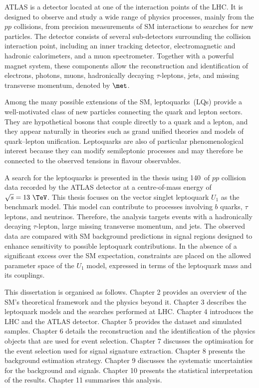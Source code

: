 ATLAS is a detector located at one of the interaction points of the LHC. 
It is designed to observe and study a wide range of physics processes, mainly from the $pp$ collisions, from precision measurements of SM interactions to searches for new particles. 
The detector consists of several sub-detectors surrounding the collision interaction point, including an inner tracking detector, electromagnetic and hadronic calorimeters, and a muon spectrometer. 
Together with a powerful magnet system, these components allow the reconstruction and identification of electrons, photons, muons, hadronically decaying $\tau$-leptons, jets, and missing transverse momentum, denoted by $\met$.

Among the many possible extensions of the SM, leptoquarks~(LQs) provide a well-motivated class of new particles connecting the quark and lepton sectors. 
They are hypothetical bosons that couple directly to a quark and a lepton, and they appear naturally in theories such as grand unified theories and models of quark--lepton unification. 
Leptoquarks are also of particular phenomenological interest because they can modify semileptonic processes and may therefore be connected to the observed tensions in flavour observables.

A search for the leptoquarks is presented in the thesis using 140~\ifb of $pp$ collision data recorded by the ATLAS detector at a centre-of-mass energy of $\sqrt{s}=13~\TeV$. 
This thesis focuses on the vector singlet leptoquark $U_{1}$ as the benchmark model. 
This model can contribute to processes involving $b$ quarks, $\tau$ leptons, and neutrinos.
Therefore, the analysis targets events with a hadronically decaying $\tau$-lepton, large missing transverse momentum, and jets. 
The observed data are compared with SM background predictions in signal regions designed to enhance sensitivity to possible leptoquark contributions. 
In the absence of a significant excess over the SM expectation, constraints are placed on the allowed parameter space of the $U_{1}$ model, expressed in terms of the leptoquark mass and its couplings.

This dissertation is organised as follows. 
Chapter 2 provides an overview of the SM's theoretical framework and the physics beyond it.
Chapter 3 describes the leptoquark models and the searches performed at LHC. 
Chapter 4 introduces the LHC and the ATLAS detector.
Chapter 5 provides the dataset and simulated samples.
Chapter 6 details the reconstruction and the identification of the physics objects that are used for event selection.
Chapter 7 discusses the optimisation for the event selection used for signal signature extraction.
Chapter 8 presents the background estimation strategy.
Chapter 9 discusses the systematic uncertainties for the background and signals.
Chapter 10 presents the statistical interpretation of the results.
Chapter 11 summarises this analysis.
